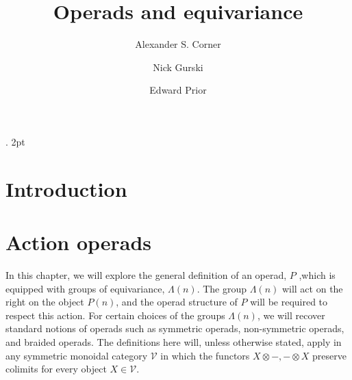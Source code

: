 \documentclass{amsbook} %
\numberwithin{section}{chapter}
\begin{document}
\newtheorem{thm}{Theorem}[section]
\newtheorem{prop}[thm]{Proposition}
\newtheorem{lem}[thm]{Lemma}
\newtheorem{cor}[thm]{Corollary}

%
     {}%
     {}%
     {\bfseries}%
     {.}%
     {2pt}%
     {}%
		
		

   \theoremstyle{example}
	\newtheorem{conv}[thm]{Conventions}
   \newtheorem{nota}[thm]{Notation}
   \newtheorem{example}[thm]{Example}
	\newtheorem{Defi}[thm]{Definition}
   \newtheorem{rem}[thm]{Remark}

   \title[Operads]{Operads and equivariance}

\author{Alexander S. Corner}
\address{}
\author{Nick Gurski}
\address{}
\author{Edward Prior}
\address{}
\email{}
\keywords{}
\subjclass{}

\maketitle

\tableofcontents


\chapter{Introduction}




\chapter{Action operads}
In this chapter, we will explore the general definition of an operad, $P$ ,which is equipped with groups of equivariance, $\Lambda(n)$.  The group $\Lambda(n)$ will act on the right on the object $P(n)$, and the operad structure of $P$ will be required to respect this action.  For certain choices of the groups $\Lambda(n)$, we will recover standard notions of operads such as symmetric operads, non-symmetric operads, and braided operads.  The definitions here will, unless otherwise stated, apply in any symmetric monoidal category $\mathcal{V}$ in which the functors $X \otimes -, - \otimes X$ preserve colimits for every object $X \in \mathcal{V}$.
\end{document}
